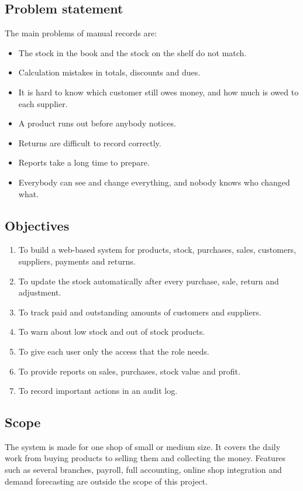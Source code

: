 \documentclass[11pt,a4paper]{article}
\begin{document}
\subsection{Problem statement}
The main problems of manual records are:
\begin{itemize}
  \item The stock in the book and the stock on the shelf do not match.
  \item Calculation mistakes in totals, discounts and dues.
  \item It is hard to know which customer still owes money, and how much is owed to each supplier.
  \item A product runs out before anybody notices.
  \item Returns are difficult to record correctly.
  \item Reports take a long time to prepare.
  \item Everybody can see and change everything, and nobody knows who changed what.
\end{itemize}

\subsection{Objectives}
\begin{enumerate}
  \item To build a web-based system for products, stock, purchases, sales, customers, suppliers, payments and returns.
  \item To update the stock automatically after every purchase, sale, return and adjustment.
  \item To track paid and outstanding amounts of customers and suppliers.
  \item To warn about low stock and out of stock products.
  \item To give each user only the access that the role needs.
  \item To provide reports on sales, purchases, stock value and profit.
  \item To record important actions in an audit log.
\end{enumerate}

\subsection{Scope}
The system is made for one shop of small or medium size. It covers the daily work from buying products to selling them and collecting the money. Features such as several branches, payroll, full accounting, online shop integration and demand forecasting are outside the scope of this project.
\end{document}
